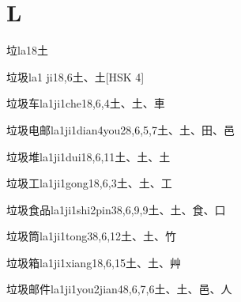 
\section*{L}

\begin{entry}{垃}{la1}{8}{⼟}
\end{entry}

\begin{entry}{垃圾}{la1 ji1}{8,6}{⼟、⼟}[HSK 4]
\end{entry}

\begin{entry}{垃圾车}{la1ji1che1}{8,6,4}{⼟、⼟、⾞}
\end{entry}

\begin{entry}{垃圾电邮}{la1ji1dian4you2}{8,6,5,7}{⼟、⼟、⽥、⾢}
\end{entry}

\begin{entry}{垃圾堆}{la1ji1dui1}{8,6,11}{⼟、⼟、⼟}
\end{entry}

\begin{entry}{垃圾工}{la1ji1gong1}{8,6,3}{⼟、⼟、⼯}
\end{entry}

\begin{entry}{垃圾食品}{la1ji1shi2pin3}{8,6,9,9}{⼟、⼟、⾷、⼝}
\end{entry}

\begin{entry}{垃圾筒}{la1ji1tong3}{8,6,12}{⼟、⼟、⽵}
\end{entry}

\begin{entry}{垃圾箱}{la1ji1xiang1}{8,6,15}{⼟、⼟、⾋}
\end{entry}

\begin{entry}{垃圾邮件}{la1ji1you2jian4}{8,6,7,6}{⼟、⼟、⾢、⼈}
\end{entry}

